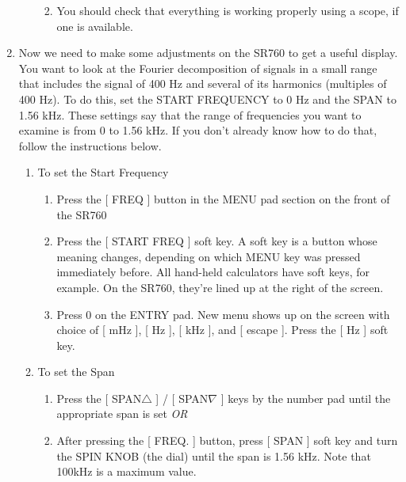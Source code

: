 \documentclass{../lab}
\begin{document}
\begin{enumerate}
\begin{itemize}
\begin{enumerate}
\begin{enumerate}
            \end{enumerate}

            \item You should check that everything is working properly using a scope, if one is available.

        \end{enumerate}

    \end{itemize}

    \item Now we need to make some adjustments on the SR760 to get a useful display. You want to look at the Fourier decomposition of signals in a small range that includes the signal of 400 Hz and several of its harmonics (multiples of 400 Hz). To do this, set the START FREQUENCY to 0 Hz and the SPAN to 1.56 kHz. These settings say that the range of frequencies you want to examine is from 0 to 1.56 kHz. If you don't already know how to do that, follow the instructions below.
    \begin{enumerate}
        \item To set the Start Frequency
        \begin{enumerate}
            \item Press the [ FREQ ] button in the MENU pad section on the front of the SR760

            \item Press the [ START FREQ ] soft key. A soft key is a button whose meaning changes, depending on which MENU key was pressed immediately before. All hand-held calculators have soft keys, for example. On the SR760, they're lined up at the right of the screen.

            \item Press 0 on the ENTRY pad. New menu shows up on the screen with choice of [ mHz ], [ Hz ], [ kHz ], and [ escape ]. Press the [ Hz ] soft key.

        \end{enumerate}

        \item To set the Span
        \begin{enumerate}
            \item Press the [ SPAN$\triangle$ ] / [ SPAN$\nabla$ ] keys by the number pad until the appropriate span is set \emph{OR}

            \item After pressing the [ FREQ. ] button, press [ SPAN ] soft key and turn the SPIN KNOB (the dial) until the span is 1.56 kHz. Note that 100kHz is a maximum value.


\end{enumerate}
\end{enumerate}
\end{enumerate}
\end{document}
